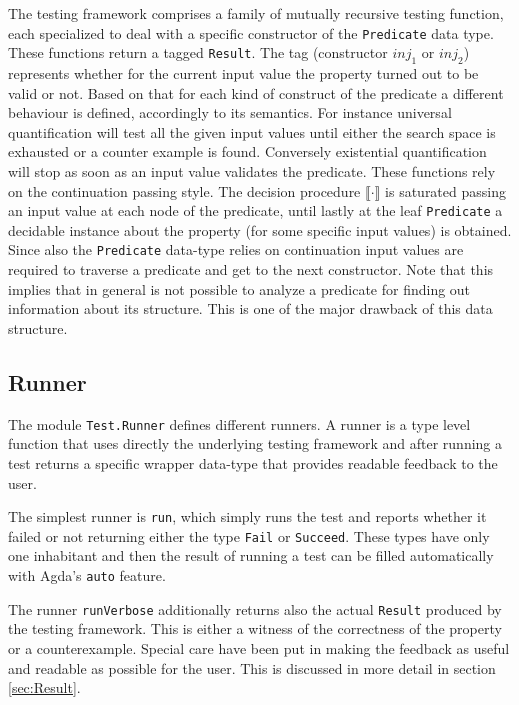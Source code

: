 \documentclass[10pt,a4paper]{article}
\begin{document}

The testing framework comprises a family of mutually recursive testing function, each specialized to deal with a specific constructor of the \texttt{Predicate} data type. These functions return a tagged \texttt{Result}.
The tag (constructor $inj_1$ or $inj_2$) represents whether for the current input value the property turned out to be valid or not.
Based on that for each kind of construct of the predicate a different behaviour is defined, accordingly to its semantics.
For instance universal quantification will test all the given input values until either the search space is exhausted or a counter example is found. Conversely existential quantification will stop as soon as an input value validates the predicate.
These functions rely on the continuation passing style.
The decision procedure $\llbracket \cdot \rrbracket$ is saturated passing an input value at each node of the predicate, until lastly at the leaf \texttt{Predicate} a decidable instance about the property (for some specific input values) is obtained.
Since also the \texttt{Predicate} data-type relies on continuation input values are required to traverse a predicate and get to the next constructor.
Note that this implies that in general is not possible to analyze a predicate for finding out information about its structure. This is one of the major drawback of this data structure.

\subsection{Runner}
The module \texttt{Test.Runner} defines different runners.
A runner is a type level function that uses directly the underlying testing framework and after running a test returns a specific wrapper data-type that provides readable feedback to the user.

The simplest runner is \texttt{run}, which simply runs the test and reports whether it failed or not returning either the type \texttt{Fail} or \texttt{Succeed}. These types have only one inhabitant and then the result of running a test can be filled automatically with Agda's \texttt{auto} feature.

The runner \texttt{runVerbose} additionally returns also the actual \texttt{Result} produced by the testing framework. This is either a witness of the correctness of the property or a counterexample.
Special care have been put in making the feedback as useful and readable as possible for the user. This is discussed in more detail in section 	\ref{sec:Result}.
\end{document}
